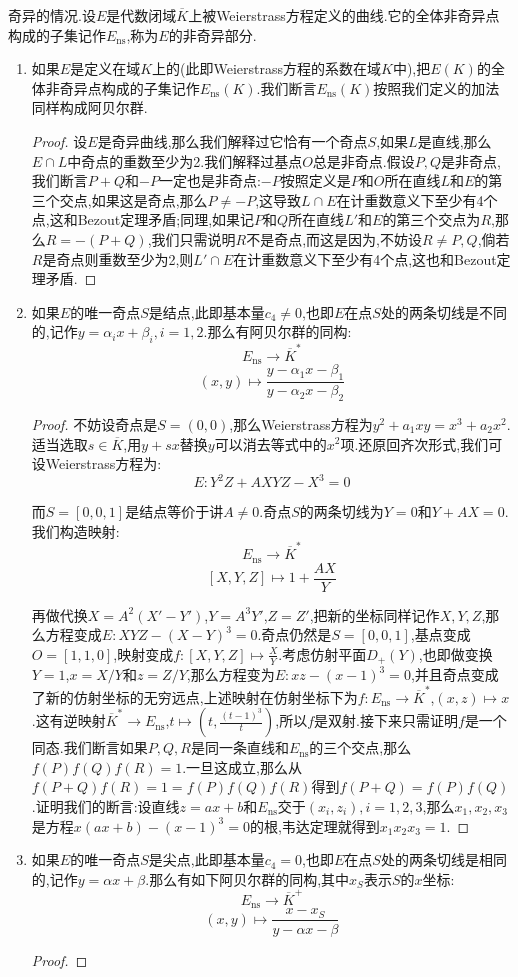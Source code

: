 奇异的情况.设$E$是代数闭域$\overline{K}$上被Weierstrass方程定义的曲线.它的全体非奇异点构成的子集记作$E_{\mathrm{ns}}$,称为$E$的非奇异部分.
\begin{enumerate}
	\item 如果$E$是定义在域$K$上的(此即Weierstrass方程的系数在域$K$中),把$E(K)$的全体非奇异点构成的子集记作$E_{\mathrm{ns}}(K)$.我们断言$E_{\mathrm{ns}}(K)$按照我们定义的加法同样构成阿贝尔群.
	\begin{proof}
		
		设$E$是奇异曲线,那么我们解释过它恰有一个奇点$S$,如果$L$是直线,那么$E\cap L$中奇点的重数至少为2.我们解释过基点$O$总是非奇点.假设$P,Q$是非奇点,我们断言$P+Q$和$-P$一定也是非奇点:$-P$按照定义是$P$和$O$所在直线$L$和$E$的第三个交点,如果这是奇点,那么$P\not=-P$,这导致$L\cap E$在计重数意义下至少有4个点,这和Bezout定理矛盾;同理,如果记$P$和$Q$所在直线$L'$和$E$的第三个交点为$R$,那么$R=-(P+Q)$,我们只需说明$R$不是奇点,而这是因为,不妨设$R\not=P,Q$,倘若$R$是奇点则重数至少为2,则$L'\cap E$在计重数意义下至少有4个点,这也和Bezout定理矛盾.
	\end{proof}
	\item 如果$E$的唯一奇点$S$是结点,此即基本量$c_4\not=0$,也即$E$在点$S$处的两条切线是不同的,记作$y=\alpha_ix+\beta_i,i=1,2$.那么有阿贝尔群的同构:
	$$E_{\mathrm{ns}}\to\overline{K}^*$$
	$$(x,y)\mapsto\frac{y-\alpha_1x-\beta_1}{y-\alpha_2x-\beta_2}$$
	\begin{proof}
		
		不妨设奇点是$S=(0,0)$,那么Weierstrass方程为$y^2+a_1xy=x^3+a_2x^2$.适当选取$s\in\overline{K}$,用$y+sx$替换$y$可以消去等式中的$x^2$项.还原回齐次形式,我们可设Weierstrass方程为:
		$$E:Y^2Z+AXYZ-X^3=0$$
		
		而$S=[0,0,1]$是结点等价于讲$A\not=0$.奇点$S$的两条切线为$Y=0$和$Y+AX=0$.我们构造映射:
		$$E_{\mathrm{ns}}\to\overline{K}^*$$
		$$[X,Y,Z]\mapsto 1+\frac{AX}{Y}$$
		
		再做代换$X=A^2(X'-Y')$,$Y=A^3Y'$,$Z=Z'$,把新的坐标同样记作$X,Y,Z$,那么方程变成$E:XYZ-(X-Y)^3=0$.奇点仍然是$S=[0,0,1]$,基点变成$O=[1,1,0]$,映射变成$f:[X,Y,Z]\mapsto\frac{X}{Y}$.考虑仿射平面$D_+(Y)$,也即做变换$Y=1$,$x=X/Y$和$z=Z/Y$,那么方程变为$E:xz-(x-1)^3=0$,并且奇点变成了新的仿射坐标的无穷远点,上述映射在仿射坐标下为$f:E_{\mathrm{ns}}\to\overline{K}^*$,$(x,z)\mapsto x$.这有逆映射$\overline{K}^*\to E_{\mathrm{ns}}$,$t\mapsto\left(t,\frac{(t-1)^3}{t}\right)$,所以$f$是双射.接下来只需证明$f$是一个同态.我们断言如果$P,Q,R$是同一条直线和$E_{\mathrm{ns}}$的三个交点,那么$f(P)f(Q)f(R)=1$.一旦这成立,那么从$f(P+Q)f(R)=1=f(P)f(Q)f(R)$得到$f(P+Q)=f(P)f(Q)$.证明我们的断言:设直线$z=ax+b$和$E_{\mathrm{ns}}$交于$(x_i,z_i),i=1,2,3$,那么$x_1,x_2,x_3$是方程$x(ax+b)-(x-1)^3=0$的根,韦达定理就得到$x_1x_2x_3=1$.
	\end{proof}
	\item 如果$E$的唯一奇点$S$是尖点,此即基本量$c_4=0$,也即$E$在点$S$处的两条切线是相同的,记作$y=\alpha x+\beta$.那么有如下阿贝尔群的同构,其中$x_S$表示$S$的$x$坐标:
	$$E_{\mathrm{ns}}\to\overline{K}^+$$
	$$(x,y)\mapsto\frac{x-x_S}{y-\alpha x-\beta}$$
	\begin{proof}
		

\end{proof}
\end{enumerate}
